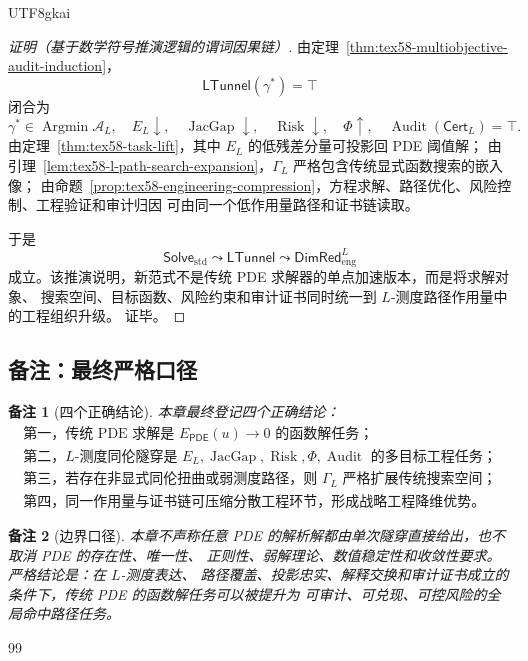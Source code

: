 \documentclass[12pt]{article}
\newtheorem{remark}{备注}[section]
\newcommand{\PDE}{\ensuremath{\mathsf{PDE}}}
\DeclareMathOperator{\Audit}{Audit}
\DeclareMathOperator{\JacGap}{JacGap}
\DeclareMathOperator{\Risk}{Risk}
\DeclareMathOperator*{\Argmin}{Argmin}
\begin{document}
\begin{CJK*}{UTF8}{gkai}
\begin{proof}[证明（基于数学符号推演逻辑的谓词因果链）]
由定理~\ref{thm:tex58-multiobjective-audit-induction}，
\[
  \mathsf{LTunnel}(\gamma^\ast)=\top
\]
闭合为
\[
  \gamma^\ast\in\Argmin\mathcal A_L,
  \quad
  E_L\downarrow,
  \quad
  \JacGap\downarrow,
  \quad
  \Risk\downarrow,
  \quad
  \Phi\uparrow,
  \quad
  \Audit(\mathsf{Cert}_L)=\top.
\]
由定理~\ref{thm:tex58-task-lift}，其中 \(E_L\) 的低残差分量可投影回 PDE 阈值解；
由引理~\ref{lem:tex58-l-path-search-expansion}，\(\Gamma_L\) 严格包含传统显式函数搜索的嵌入像；
由命题~\ref{prop:tex58-engineering-compression}，方程求解、路径优化、风险控制、工程验证和审计归因
可由同一个低作用量路径和证书链读取。

于是
\[
  \mathsf{Solve}_{\mathrm{std}}
  \leadsto
  \mathsf{LTunnel}
  \leadsto
  \mathsf{DimRed}_{\mathrm{eng}}^L
\]
成立。该推演说明，新范式不是传统 PDE 求解器的单点加速版本，而是将求解对象、
搜索空间、目标函数、风险约束和审计证书同时统一到 \(L\)-测度路径作用量中的工程组织升级。
证毕。
\end{proof}

\subsection{备注：最终严格口径}
\label{subsec:tex58-strategic-dimred-remarks}

\begin{remark}[四个正确结论]
本章最终登记四个正确结论：
\[
  \boxed{
  \begin{gathered}
  \text{第一，传统 PDE 求解是 }E_{\PDE}(u)\to0\text{ 的函数解任务；}\\
  \text{第二，}L\text{-测度同伦隧穿是 }
  E_L,\JacGap,\Risk,\Phi,\Audit\text{ 的多目标工程任务；}\\
  \text{第三，若存在非显式同伦扭曲或弱测度路径，则 } \Gamma_L
  \text{ 严格扩展传统搜索空间；}\\
  \text{第四，同一作用量与证书链可压缩分散工程环节，形成战略工程降维优势。}
  \end{gathered}
  }
\]
\end{remark}

\begin{remark}[边界口径]
本章不声称任意 PDE 的解析解都由单次隧穿直接给出，也不取消 PDE 的存在性、唯一性、
正则性、弱解理论、数值稳定性和收敛性要求。严格结论是：在 \(L\)-测度表达、
路径覆盖、投影忠实、解释交换和审计证书成立的条件下，传统 PDE 的函数解任务可以被提升为
可审计、可兑现、可控风险的全局命中路径任务。
\end{remark}

\clearpage

\begin{thebibliography}{99}
\raggedright


\end{thebibliography}
\end{CJK*}
\end{document}
